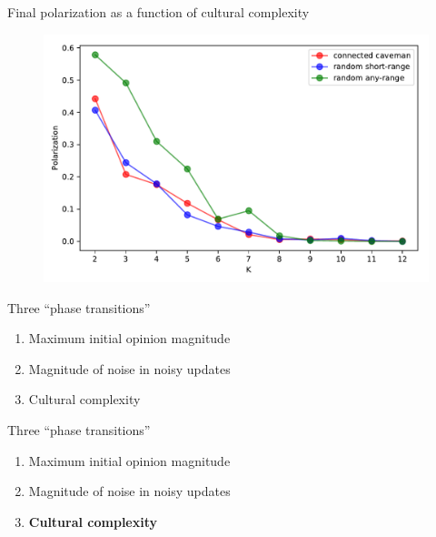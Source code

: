 \documentclass[11pt]{beamer}
\begin{document}
\begin{frame}{Final polarization as a function of cultural complexity}
  \begin{figure}
    \centering
        \includegraphics[width=\textwidth]{Figures/finegrained_p_vs_K.pdf}
    \label{fig:k_finegrained}
  \end{figure}
\end{frame}

\begin{frame}{Three ``phase transitions''}
  \begin{enumerate}
    \item Maximum initial opinion magnitude
    \item Magnitude of noise in noisy updates
    \item Cultural complexity
  \end{enumerate}
\end{frame}

\begin{frame}{Three ``phase transitions''}
  \begin{enumerate}
    \item Maximum initial opinion magnitude
    \item Magnitude of noise in noisy updates
    \item \textbf{Cultural complexity}
  \end{enumerate}
\end{frame}
\end{document}
